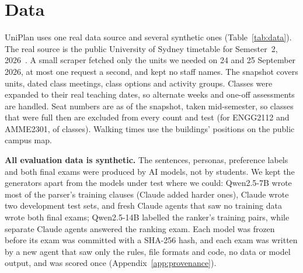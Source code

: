 \section{Data}\label{sec:data}

UniPlan uses one real data source and several synthetic ones (Table~\ref{tab:data}). The real source is the public University of Sydney timetable for Semester~2, 2026~\cite{usyd_timetable}. A small scraper fetched only the units we needed on 24 and 25 September 2026, at most one request a second, and kept no staff names. The snapshot covers \dUnits{} units, \dMeetings{} dated class meetings, \dOptions{} class options and \dGroups{} activity groups. Classes were expanded to their real teaching dates, so alternate weeks and one-off assessments are handled. Seat numbers are as of the snapshot, taken mid-semester, so classes that were full then are excluded from every count and test (for ENGG2112 and AMME2301, \ttTwoFull{} of \ttTwoOptions{} classes). Walking times use the \dBuildings{} buildings' positions on the public campus map.

\begin{table}[h]
	\caption{Datasets. Everything below the line was written or labelled by AI models; no real student wrote a sentence, answered a question or labelled a pair.}
	\label{tab:data}
	\centering\small
	
\end{table}

\textbf{All evaluation data is synthetic.} The sentences, personas, preference labels and both final exams were produced by AI models, not by students. We kept the generators apart from the models under test where we could: Qwen2.5-7B wrote most of the parser's training clauses (Claude added \sHardAll{} harder ones), Claude wrote two development test sets, and fresh Claude agents that saw no training data wrote both final exams; Qwen2.5-14B labelled the ranker's training pairs, while separate Claude agents answered the ranking exam. Each model was frozen before its exam was committed with a SHA-256 hash, and each exam was written by a new agent that saw only the rules, file formats and code, no data or model output, and was scored once (Appendix~\ref{app:provenance}).
